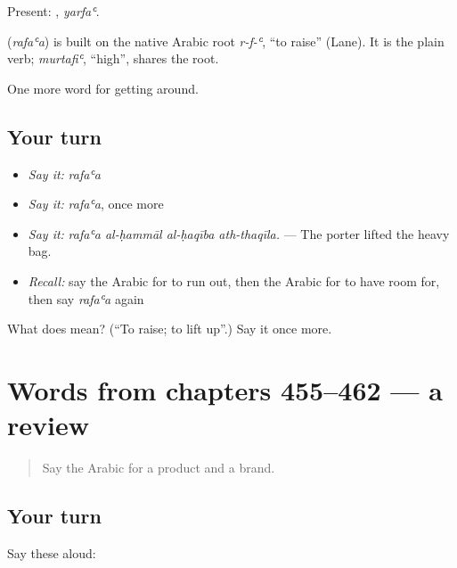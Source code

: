 Present: , \emph{yarfaʿ}.

\begin{cousinweb}
\textbf{} (\emph{rafaʿa}) is built on the native Arabic root \emph{r-f-ʿ}, \textquotedblleft{}to raise\textquotedblright{} (Lane). It is the plain verb; \emph{murtafiʿ}, \textquotedblleft{}high\textquotedblright{}, shares the root.
\end{cousinweb}

\begin{grammarlens}[title={What you've built}]
One more word for getting around.
\end{grammarlens}

\subsection*{Your turn}
\begin{itemize}
\raggedright
  \item \emph{Say it:} \emph{rafaʿa}
  \item \emph{Say it:} \emph{rafaʿa}, once more
  \item \emph{Say it:} \emph{rafaʿa al-ḥammāl al-ḥaqība ath-thaqīla.} — The porter lifted the heavy bag.
  \item \emph{Recall:} say the Arabic for to run out, then the Arabic for to have room for, then say \emph{rafaʿa} again
\end{itemize}

\begin{tcolorbox}[breakable,colback=teal!4,colframe=teal!35!black,title={Before you move on}]
What does  mean? (\textquotedblleft{}To raise; to lift up\textquotedblright{}.) Say it once more.
\end{tcolorbox}
\section[(dialogue)]{Words from chapters 455–462 — a review}

\label{lesson:AR-R462-review-455-462}



\begin{quote}
Say the Arabic for a product and a brand.
\end{quote}

\subsection*{Your turn}
Say these aloud:

